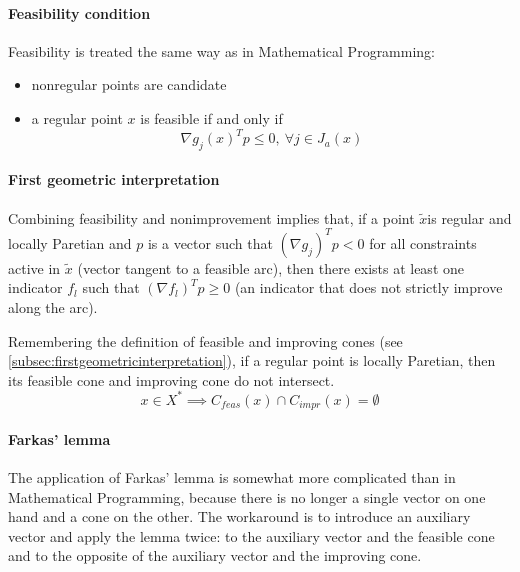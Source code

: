 \paragraph{Feasibility condition} Feasibility is treated the same way as in Mathematical Programming: 
\begin{itemize}
	\item nonregular points are candidate
	
	\item a regular point $x$ is feasible if and only if
	$$ \nabla g_j(x)^T p \leq 0, \ \forall j \in J_a (x) $$
\end{itemize}

\paragraph{First geometric interpretation} Combining feasibility and nonimprovement implies that, if a point $\tilde x$is regular and locally Paretian and $p$ is a vector such that $(\nabla g_j)^Tp < 0$ for all constraints active in $\tilde x$ (vector tangent to a feasible arc), then there exists at least one indicator $f_l$ such that $(\nabla f_l)^T p \geq 0$ (an indicator that does not strictly improve along the arc).

Remembering the definition of feasible and improving cones (see \ref{subsec:firstgeometricinterpretation}), if a regular point is locally Paretian, then its feasible cone and improving cone do not intersect.
$$ x \in X^\ast \implies C_{feas} (x) \cap C_{impr} (x) = \emptyset $$

\paragraph{Farkas' lemma} The application of Farkas' lemma is somewhat more complicated than in Mathematical Programming, because there is no longer a single vector on one hand and a cone on the other. The workaround is to introduce an auxiliary vector and apply the lemma twice: to the auxiliary vector and the feasible cone and to the opposite of the auxiliary vector and the improving cone.


